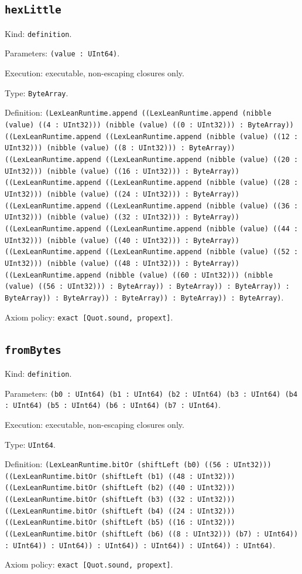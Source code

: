 \documentclass[11pt]{article}
\begin{document}
\subsection*{\texttt{hexLittle}}
\noindent Kind: \texttt{definition}.\par
\noindent Parameters: \texttt{(value : UInt64)}.\par
\noindent Execution: executable, non-escaping closures only.\par
\noindent Type: \texttt{ByteArray}.\par
\noindent Definition: \texttt{(LexLeanRuntime.append ((LexLeanRuntime.append (nibble (value) ((4 : UInt32))) (nibble (value) ((0 : UInt32))) : ByteArray)) ((LexLeanRuntime.append ((LexLeanRuntime.append (nibble (value) ((12 : UInt32))) (nibble (value) ((8 : UInt32))) : ByteArray)) ((LexLeanRuntime.append ((LexLeanRuntime.append (nibble (value) ((20 : UInt32))) (nibble (value) ((16 : UInt32))) : ByteArray)) ((LexLeanRuntime.append ((LexLeanRuntime.append (nibble (value) ((28 : UInt32))) (nibble (value) ((24 : UInt32))) : ByteArray)) ((LexLeanRuntime.append ((LexLeanRuntime.append (nibble (value) ((36 : UInt32))) (nibble (value) ((32 : UInt32))) : ByteArray)) ((LexLeanRuntime.append ((LexLeanRuntime.append (nibble (value) ((44 : UInt32))) (nibble (value) ((40 : UInt32))) : ByteArray)) ((LexLeanRuntime.append ((LexLeanRuntime.append (nibble (value) ((52 : UInt32))) (nibble (value) ((48 : UInt32))) : ByteArray)) ((LexLeanRuntime.append (nibble (value) ((60 : UInt32))) (nibble (value) ((56 : UInt32))) : ByteArray)) : ByteArray)) : ByteArray)) : ByteArray)) : ByteArray)) : ByteArray)) : ByteArray)) : ByteArray)}.\par
\noindent Axiom policy: \texttt{exact [Quot.sound, propext]}.\par
\subsection*{\texttt{fromBytes}}
\noindent Kind: \texttt{definition}.\par
\noindent Parameters: \texttt{(b0 : UInt64) (b1 : UInt64) (b2 : UInt64) (b3 : UInt64) (b4 : UInt64) (b5 : UInt64) (b6 : UInt64) (b7 : UInt64)}.\par
\noindent Execution: executable, non-escaping closures only.\par
\noindent Type: \texttt{UInt64}.\par
\noindent Definition: \texttt{(LexLeanRuntime.bitOr (shiftLeft (b0) ((56 : UInt32))) ((LexLeanRuntime.bitOr (shiftLeft (b1) ((48 : UInt32))) ((LexLeanRuntime.bitOr (shiftLeft (b2) ((40 : UInt32))) ((LexLeanRuntime.bitOr (shiftLeft (b3) ((32 : UInt32))) ((LexLeanRuntime.bitOr (shiftLeft (b4) ((24 : UInt32))) ((LexLeanRuntime.bitOr (shiftLeft (b5) ((16 : UInt32))) ((LexLeanRuntime.bitOr (shiftLeft (b6) ((8 : UInt32))) (b7) : UInt64)) : UInt64)) : UInt64)) : UInt64)) : UInt64)) : UInt64)) : UInt64)}.\par
\noindent Axiom policy: \texttt{exact [Quot.sound, propext]}.\par
\end{document}

